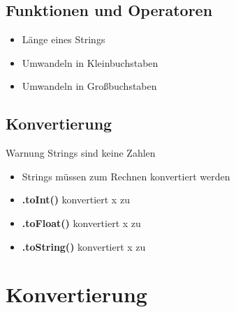 \subsection{Funktionen und Operatoren}
\begin{frame}
    \slidehead

    \begin{itemize}
        \item Länge eines Strings

        \item Umwandeln in Kleinbuchstaben

        \item Umwandeln in Großbuchstaben
    \end{itemize}
\end{frame}


\subsection{Konvertierung}
\begin{frame}
    \slidehead
    \begin{block}{Warnung}
        Strings sind keine Zahlen
    \end{block}


    \pause

    \begin{itemize}[<+->]
        \item Strings müssen zum Rechnen konvertiert werden
        \item \textbf{.toInt()} konvertiert x zu 
        \item \textbf{.toFloat()} konvertiert x zu 
        \item \textbf{.toString()} konvertiert x zu 
    \end{itemize}

\end{frame}

\section{Konvertierung}
